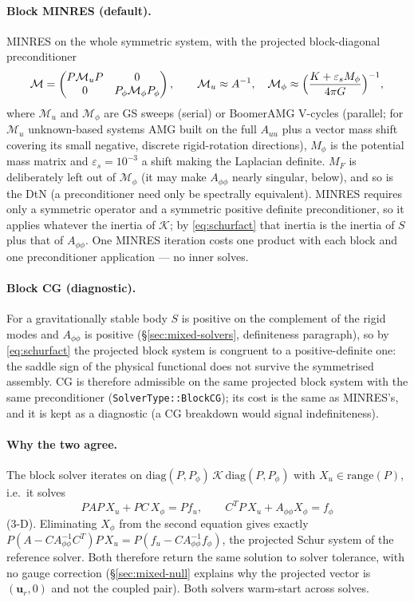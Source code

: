 \documentclass[11pt]{article}
\numberwithin{equation}{section}
\theoremstyle{remark}
\newcommand{\eps}{\varepsilon}
\newcommand{\vu}{\mathbf{u}}
\newcommand{\code}[1]{\texttt{#1}}
\begin{document}
\paragraph{Block MINRES (default).} MINRES on the whole symmetric system,
with the projected block-diagonal preconditioner
\begin{equation}
  \mathcal{M} = \begin{pmatrix} P\mathcal{M}_uP & 0\\ 0 &
     P_\phi\mathcal{M}_\phi P_\phi\end{pmatrix}, \qquad
  \mathcal{M}_u\approx A^{-1}, \quad
  \mathcal{M}_\phi\approx\Bigl(\frac{K + \eps_sM_\phi}{4\pi G}\Bigr)^{-1},
\end{equation}
where $\mathcal{M}_u$ and $\mathcal{M}_\phi$ are GS sweeps (serial) or
BoomerAMG V-cycles (parallel; for $\mathcal{M}_u$ unknown-based systems
AMG built on the full $A_{uu}$ plus a vector mass shift covering its small
negative, discrete rigid-rotation directions),
$M_\phi$ is the potential mass matrix and $\eps_s = 10^{-3}$ a shift making
the Laplacian definite. $M_F$ is deliberately left out of
$\mathcal{M}_\phi$ (it may make $A_{\phi\phi}$ nearly singular, below),
and so is the DtN (a preconditioner need only be spectrally equivalent).
MINRES requires only a symmetric operator and a symmetric positive
definite preconditioner, so it applies whatever the inertia of
$\mathcal{K}$; by \eqref{eq:schurfact} that inertia is the inertia of $S$
plus that of $A_{\phi\phi}$. One MINRES iteration costs one product with
each block and one preconditioner application --- no inner solves.

\paragraph{Block CG (diagnostic).} For a gravitationally stable body $S$ is
positive on the complement of the rigid modes and $A_{\phi\phi}$ is
positive (\S\ref{sec:mixed-solvers}, definiteness paragraph), so by
\eqref{eq:schurfact} the projected block system is congruent to a
positive-definite one: the saddle sign of the physical functional does not
survive the symmetrised assembly. CG is therefore admissible on the same
projected block system with the same preconditioner
(\code{SolverType::BlockCG}); its cost is the same as MINRES's, and
it is kept as a diagnostic (a CG breakdown would signal indefiniteness).

\paragraph{Why the two agree.} The block solver iterates on
$\mathrm{diag}(P,P_\phi)\,\mathcal{K}\,\mathrm{diag}(P,P_\phi)$ with
$X_u\in\mathrm{range}(P)$, i.e.\ it solves
\[
  PAP\,X_u + PC\,X_\phi = Pf_u, \qquad C^TP\,X_u + A_{\phi\phi}X_\phi = f_\phi
\]
(3-D). Eliminating $X_\phi$ from the second equation gives exactly
$P(A - CA_{\phi\phi}^{-1}C^T)P\,X_u = P(f_u - CA_{\phi\phi}^{-1}f_\phi)$,
the projected Schur system of the reference solver. Both therefore return
the same solution to solver tolerance, with no gauge correction
(\S\ref{sec:mixed-null} explains why the projected vector is $(\vu_r, 0)$
and not the coupled pair). Both solvers warm-start across solves.
\end{document}
